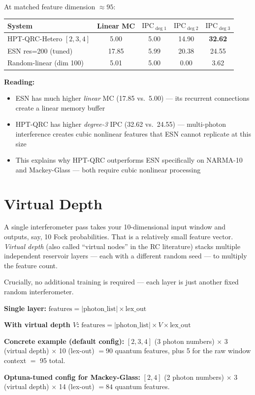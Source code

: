 \documentclass[11pt]{article}
\newcommand{\concept}[2]{%
  \begin{tcolorbox}[conceptbox, title={#1}]
  #2
  \end{tcolorbox}
}
\newcommand{\mathblock}[2]{%
  \begin{tcolorbox}[mathbox, title={Math: #1}]
  #2
  \end{tcolorbox}
}
\newcommand{\example}[2]{%
  \begin{tcolorbox}[examplebox, title={Concrete Example: #1}]
  #2
  \end{tcolorbox}
}
\begin{document}
\example{IPC Results in the Paper (Table 7)}{
At matched feature dimension $\approx 95$:
\begin{center}
\begin{tabular}{lcccc}
\toprule
System & Linear MC & $\text{IPC}_{\deg 1}$ & $\text{IPC}_{\deg 2}$ & $\text{IPC}_{\deg 3}$ \\
\midrule
HPT-QRC-Hetero $[2,3,4]$ & 5.00 & 5.00 & 14.90 & \textbf{32.62} \\
ESN res=200 (tuned) & 17.85 & 5.99 & 20.38 & 24.55 \\
Random-linear (dim 100) & 5.01 & 5.00 & 0.00 & 3.62 \\
\bottomrule
\end{tabular}
\end{center}

\textbf{Reading:}
\begin{itemize}
  \item ESN has much higher \emph{linear} MC (17.85 vs.\ 5.00) --- its
        recurrent connections create a linear memory buffer
  \item HPT-QRC has higher \emph{degree-3} IPC (32.62 vs.\ 24.55) ---
        multi-photon interference creates cubic nonlinear features that
        ESN cannot replicate at this size
  \item This explains why HPT-QRC outperforms ESN specifically on
        NARMA-10 and Mackey-Glass --- both require cubic nonlinear processing
\end{itemize}
}

\section{Virtual Depth}

\concept{More Layers = More Features, No Training Required}{
A single interferometer pass takes your 10-dimensional input window
and outputs, say, 10 Fock probabilities. That is a relatively small
feature vector. \emph{Virtual depth} (also called ``virtual nodes''
in the RC literature) stacks multiple independent reservoir layers ---
each with a different random seed --- to multiply the feature count.

Crucially, no additional training is required --- each layer is just
another fixed random interferometer.
}

\mathblock{Feature Dimension with Virtual Depth}{
\textbf{Single layer:}
$\text{features} = |\text{photon\_list}| \times \text{lex\_out}$

\textbf{With virtual depth $V$:}
$\text{features} = |\text{photon\_list}| \times V \times \text{lex\_out}$

\textbf{Concrete example (default config):}
$[2,3,4]$ (3 photon numbers) $\times$ 3 (virtual depth) $\times$ 10 (lex-out)
$= 90$ quantum features, plus 5 for the raw window context $=$ 95 total.

\textbf{Optuna-tuned config for Mackey-Glass:}
$[2,4]$ (2 photon numbers) $\times$ 3 (virtual depth) $\times$ 14 (lex-out)
$= 84$ quantum features.
}
\end{document}
